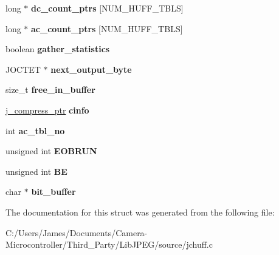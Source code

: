 \begin{DoxyCompactItemize}
long $\ast$ {\bfseries dc\+\_\+count\+\_\+ptrs} \mbox{[}N\+U\+M\+\_\+\+H\+U\+F\+F\+\_\+\+T\+B\+LS\mbox{]}
\item 
\mbox{\label{structhuff__entropy__encoder_a3a24037b7c2fd0dec51f180b749792e8}} 
long $\ast$ {\bfseries ac\+\_\+count\+\_\+ptrs} \mbox{[}N\+U\+M\+\_\+\+H\+U\+F\+F\+\_\+\+T\+B\+LS\mbox{]}
\item 
\mbox{\label{structhuff__entropy__encoder_a874dd3622d5d411d0c506135340b1848}} 
boolean {\bfseries gather\+\_\+statistics}
\item 
\mbox{\label{structhuff__entropy__encoder_a3c91b5250e09dfa65e63ab97d6fdd6ce}} 
J\+O\+C\+T\+ET $\ast$ {\bfseries next\+\_\+output\+\_\+byte}
\item 
\mbox{\label{structhuff__entropy__encoder_a84932d2a2b96ee83f5d2e9608b5fd83a}} 
size\+\_\+t {\bfseries free\+\_\+in\+\_\+buffer}
\item 
\mbox{\label{structhuff__entropy__encoder_a51c360f99878652e5a939fcbe63f7086}} 
\hyperlink{structjpeg__compress__struct}{j\+\_\+compress\+\_\+ptr} {\bfseries cinfo}
\item 
\mbox{\label{structhuff__entropy__encoder_af6066d297004cb585d046de1e8deab09}} 
int {\bfseries ac\+\_\+tbl\+\_\+no}
\item 
\mbox{\label{structhuff__entropy__encoder_a1637ef6c8a3a9c72246e984bbb2fa16b}} 
unsigned int {\bfseries E\+O\+B\+R\+UN}
\item 
\mbox{\label{structhuff__entropy__encoder_a4fb38fa89b90c9893ee3f3d69763dec4}} 
unsigned int {\bfseries BE}
\item 
\mbox{\label{structhuff__entropy__encoder_a1c06a5186c25bc8d2db1ed985b64a865}} 
char $\ast$ {\bfseries bit\+\_\+buffer}
\end{DoxyCompactItemize}


The documentation for this struct was generated from the following file\+:\begin{DoxyCompactItemize}
\item 
C\+:/\+Users/\+James/\+Documents/\+Camera-\/\+Microcontroller/\+Third\+\_\+\+Party/\+Lib\+J\+P\+E\+G/source/jchuff.\+c\end{DoxyCompactItemize}
